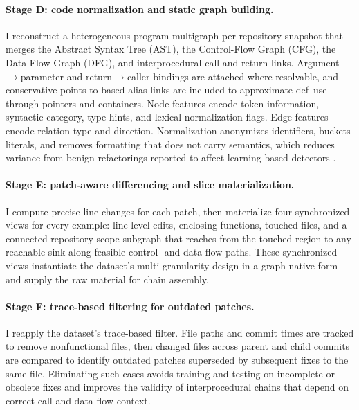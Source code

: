 \documentclass{buthesis}
\begin{document}
\paragraph{Stage D: code normalization and static graph building.}
I reconstruct a heterogeneous program multigraph per repository snapshot that merges the Abstract Syntax Tree (AST), the Control-Flow Graph (CFG), the Data-Flow Graph (DFG), and interprocedural call and return links. Argument$\rightarrow$parameter and return$\rightarrow$caller bindings are attached where resolvable, and conservative points-to based alias links are included to approximate def–use through pointers and containers. Node features encode token information, syntactic category, type hints, and lexical normalization flags. Edge features encode relation type and direction. Normalization anonymizes identifiers, buckets literals, and removes formatting that does not carry semantics, which reduces variance from benign refactorings reported to affect learning-based detectors \cite{Chakraborty2020,Li2022Empirical}.

\paragraph{Stage E: patch-aware differencing and slice materialization.}
I compute precise line changes for each patch, then materialize four synchronized views for every example: line-level edits, enclosing functions, touched files, and a connected repository-scope subgraph that reaches from the touched region to any reachable sink along feasible control- and data-flow paths. These synchronized views instantiate the dataset’s multi-granularity design in a graph-native form and supply the raw material for chain assembly.

\paragraph{Stage F: trace-based filtering for outdated patches.}
I reapply the dataset’s trace-based filter. File paths and commit times are tracked to remove nonfunctional files, then changed files across parent and child commits are compared to identify outdated patches superseded by subsequent fixes to the same file. Eliminating such cases avoids training and testing on incomplete or obsolete fixes and improves the validity of interprocedural chains that depend on correct call and data-flow context.
\end{document}
